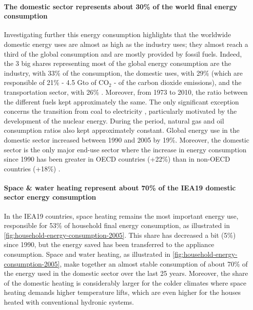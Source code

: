 \paragraph{The domestic sector represents about 30\% of the world
  final energy consumption} Investigating further this energy
consumption highlights that the worldwide domestic energy uses are
almost as high as the industry uses; they almost reach a third of the
global consumption and are mostly provided by fossil
fuels. Indeed, the 3
big shares representing most of the global energy consumption are the
industry, with 33\% of the consumption, the domestic uses, with 29\%
(which are responsible of 21\% - 4.5 Gto of CO$_{2}$ - of the carbon dioxide emissions), and the
transportation sector, with 26\%
\citep[p.\,17]{iea-2008a}. Moreover, from
1973 to 2010, the ratio between the different fuels kept approximately
the same. The only significant exception concerns the transition from
coal to electricity \citep[p.\,28]{iea-2008a}, particularly motivated
by the development of the nuclear energy. During the period, natural
gas and oil consumption ratios also kept approximately
constant. Global
energy use in the domestic sector increased between 1990 and 2005 by
19\%. Moreover, the domestic sector is the only major end-use sector
where the increase in energy consumption since 1990 has been greater
in OECD countries (+22\%) than in non-OECD countries (+18\%)
\citep[p.\,44]{iea-2008a}.


\paragraph{Space \& water heating represent about 70\% of the IEA19
  domestic sector energy consumption} In the IEA19
countries, space heating remains the most important energy use,
responsible for 53\% of household final energy consumption, as
illustrated in \cref{fig:household-energy-consumption-2005}. This
share has decreased a bit (5\%) since 1990, but the energy saved has
been transferred to the appliance consumption. Space and water
heating, as illustrated in
\cref{fig:household-energy-consumption-2005}, make together an almost
stable consumption of about 70\% of the energy used in the domestic
sector over the last 25 years. Moreover, the share of the domestic
heating is considerably larger for the colder climates where space
heating demands higher temperature lifts, which are even higher for
the houses heated with conventional hydronic
systems.

